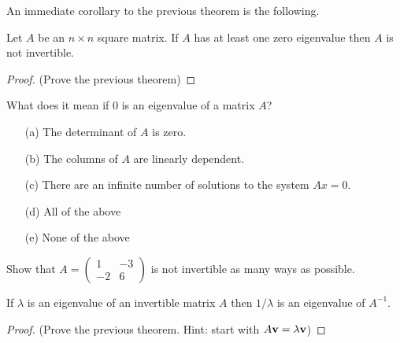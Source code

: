 An immediate corollary to the previous theorem is the following.
\begin{cor}
    Let $A$ be an $n \times n$ square matrix.  If $A$ has at least one zero eigenvalue
    then $A$ is not invertible.
\end{cor}
\begin{proof}
    (Prove the previous theorem)
\end{proof}

\begin{problem}
    What does it mean if 0 is an eigenvalue of a matrix $A$?
\begin{enumerate}
    \item[(a)] The determinant of $A$ is zero.
\item[(b)] The columns of $A$ are linearly dependent.
\item[(c)] There are an infinite number of solutions to the system $Ax = 0.$
\item[(d)] All of the above
\item[(e)] None of the above
\end{enumerate}
\end{problem}
%             



\begin{problem}
    Show that $A = \begin{pmatrix} 1 & -3 \\ -2 & 6 \end{pmatrix}$ is not invertible as
        many ways as possible.
\end{problem}


\begin{thm}
    If $\lambda$ is an eigenvalue of an invertible matrix $A$ then $1/\lambda$ is an
    eigenvalue of $A^{-1}$.
\end{thm}
\begin{proof}
    (Prove the previous theorem.  Hint: start with $A {\bf v} = \lambda {\bf v}$)
\end{proof}


